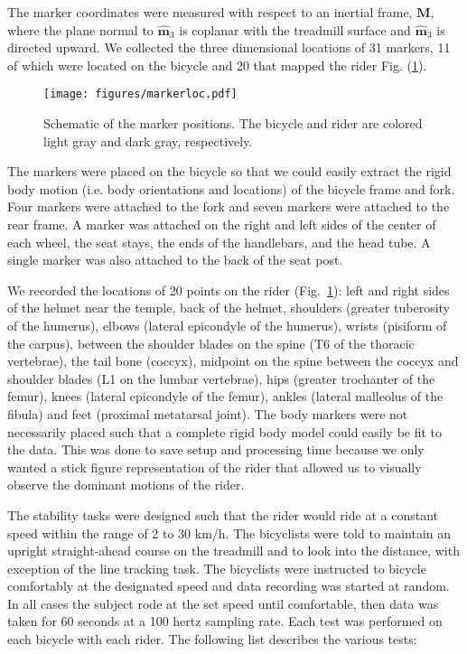\documentclass[smallextended]{svjour3}     %
\begin{document}
The marker coordinates were measured with respect to an inertial frame,
$\mathbf{M}$, where the plane normal to $\hat{\mathbf{m}}_3$ is coplanar with
the treadmill surface and $\hat{\mathbf{m}}_3$ is directed upward. We collected
the three dimensional locations of 31 markers, 11 of which were located on the
bicycle and 20 that mapped the rider Fig. (\ref{fig:markerloc}).
\begin{figure}
    \centering
        \texttt{[image: figures/markerloc.pdf]}
    \caption{Schematic of the marker positions. The bicycle and rider are colored light gray and dark gray, respectively.}
    \label{fig:markerloc}
\end{figure}

The markers were placed on the bicycle so that we could easily extract the
rigid body motion (i.e. body orientations and locations) of the bicycle frame
and fork. Four markers were attached to the fork and seven markers were
attached to the rear frame. A marker was attached on the right and left sides
of the center of each wheel, the seat stays, the ends of the handlebars, and
the head tube. A single marker was also attached to the back of the seat post.

We recorded the locations of 20 points
on the rider (Fig.~\ref{fig:markerloc}): left and right sides of
the helmet near the temple, back of the helmet, shoulders (greater tuberosity
of the humerus), elbows (lateral epicondyle of the humerus), wrists (pisiform
of the carpus), between the
shoulder blades on the spine (T6 of the thoracic vertebrae), the tail bone
(coccyx), midpoint on the spine between the coccyx and shoulder blades (L1 on
the lumbar vertebrae), hips (greater trochanter of the femur), knees (lateral
epicondyle of the femur), ankles (lateral malleolus of the fibula) and feet
(proximal metatarsal joint). The body markers were not necessarily placed such
that a complete rigid body model could easily be fit to the data. This was done
to save setup and processing time because we only wanted a stick figure
representation of the rider that allowed us to visually observe the dominant
motions of the rider.

The stability tasks were designed such that the rider would ride at a constant speed
within the range of 2 to 30 km/h. The bicyclists were told to maintain an
upright straight-ahead course on the treadmill and to look into the distance,
with exception of the line tracking task. The bicyclists were instructed to
bicycle comfortably at the designated speed and data recording was started
at random. In all cases the subject rode at the set speed until comfortable,
then data was taken for 60 seconds at a 100 hertz sampling rate. Each test was
performed on each bicycle with each rider. The following list describes the various
tests:
\end{document}
